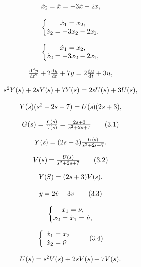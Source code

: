 \documentclass{article}
\begin{document}
\[
$$
\dot{x}_{2}=\ddot{x}=-3 \dot{x}-2 x,
$$
\]

\[
$$
\left\{\begin{matrix} \dot{x}_{1}=x_{2}, \\ \dot{x}_{2}=-3 x_{2}-2 x_{1}. \end{matrix} \right.
$$
\]

\[
$$
\left\{\begin{matrix} \dot{x}_{1}=x_{2}, \\ \dot{x}_{2}=-3 x_{2}-2 x_{1}, \end{matrix} \right.
$$
\]

\[
$$
\frac{\mathrm{d}^{2} y} {\mathrm{d} t^{2}}+2 \frac{\mathrm{d} y} {\mathrm{d} t}+7 y=2 \frac{\mathrm{d} u} {\mathrm{d} t}+3 u,
$$
\]

\[
$$
s^{2} Y ( s )+2 s Y ( s )+7 Y ( s )=2 s U ( s )+3 U ( s ),
$$
\]

\[
$$
Y ( s ) ( s^{2}+2 s+7 )=U ( s ) ( 2 s+3 ),
$$
\]

\[
$$
G ( s )=\frac{Y ( s )} {U ( s )}=\frac{2 s+3} {s^{2}+2 s+7} \tag{3.1}
$$
\]

\[
$$
Y ( s )=( 2 s+3 ) \frac{U ( s )} {s^{2}+2 s+7}.
$$
\]

\[
$$
V ( s )={\frac{U ( s )} {s^{2}+2 s+7}} \tag{3.2}
$$
\]

\[
$$
Y ( S )=( 2 s+3 ) V ( s ).
$$
\]

\[
$$
y=2 \dot{v}+3 v \tag{3.3}
$$
\]

\[
$$
\left\{\begin{matrix} x_{1}=\nu, \\ x_{2}=\dot{x}_{1}=\dot{\nu}, \end{matrix} \right.
$$
\]

\[
$$
\left\{\begin{array} {l} {\displaystyle\dot{x}_{1}=x_{2}} \\ {\dot{x}_{2}=\ddot{\nu}} \\ \end{array} \right. \tag{3.4}
$$
\]

\[
$$
U ( s )=s^{2} V ( s )+2 s V ( s )+7 V ( s ).
$$
\]
\end{document}
